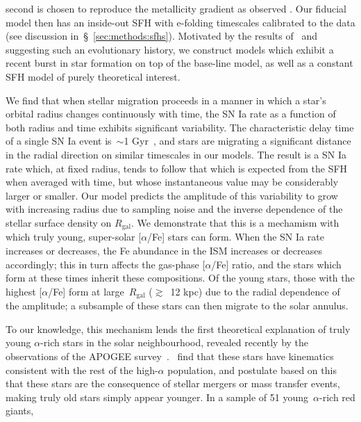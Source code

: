 \documentclass[fleqn, usenatbib]{mnras}
\begin{document}
second is chosen to reproduce the metallicity gradient as observed 
\citep{Daflon2009, Frinchaboy2013, Hayden2014, Weinberg2019}. Our fiducial 
model then has an inside-out SFH with e-folding timescales calibrated to the 
\citet{Sanchez2020} data (see discussion in~\S~\ref{sec:methods:sfhs}). 
Motivated by the results of~\citet{Mor2019} and~\citet{Isern2019} suggesting 
such an evolutionary history, we construct models which exhibit a recent burst 
in star formation on top of the base-line model, as well as a constant SFH 
model of purely theoretical interest. 
\par 
We find that when stellar migration proceeds in a manner in which a star's 
orbital radius changes continuously with time, the SN Ia rate as a function of 
both radius and time exhibits significant variability. The characteristic delay 
time of a single SN Ia event is~$\sim$1 Gyr~\citep{Maoz2012, Maoz2017}, and 
stars are migrating a significant distance in the radial direction on similar 
timescales in our models. The result is a SN Ia rate which, at fixed radius, 
tends to follow that which is expected from the SFH when averaged with time, 
but whose instantaneous value may be considerably larger or smaller. Our model 
predicts the amplitude of this variability to grow with increasing radius due 
to sampling noise and the inverse dependence of the stellar surface density on 
$R_\text{gal}$. We demonstrate that this is a mechamism with which truly young, 
super-solar [$\alpha$/Fe] stars can form. When the SN Ia rate increases or 
decreases, the Fe abundance in the ISM increases or 
decreases accordingly; this in turn affects the gas-phase [$\alpha$/Fe] ratio, 
and the stars which form at these times inherit these compositions. Of the 
young stars, those with the highest [$\alpha$/Fe] form at large~$R_\text{gal}$ 
($\gtrsim$~12 kpc) due to the radial dependence of the amplitude; a subsample 
of these stars can then migrate to the solar annulus. 
\par 
To our knowledge, this mechanism lends the first theoretical explanation of 
truly young $\alpha$-rich stars in the solar neighbourhood, revealed recently 
by the observations of the APOGEE survey~\citep{Martig2016, Feuillet2018, 
Feuillet2019, SilvaAguirre2018}.~\citet{SilvaAguirre2018} find that 
these stars have kinematics consistent with the rest of the high-$\alpha$ 
population, and postulate based on this that these stars are the consequence 
of stellar mergers or mass transfer events, making truly old stars simply 
appear younger. In a sample of 51 young~$\alpha$-rich red giants, 
\end{document}
